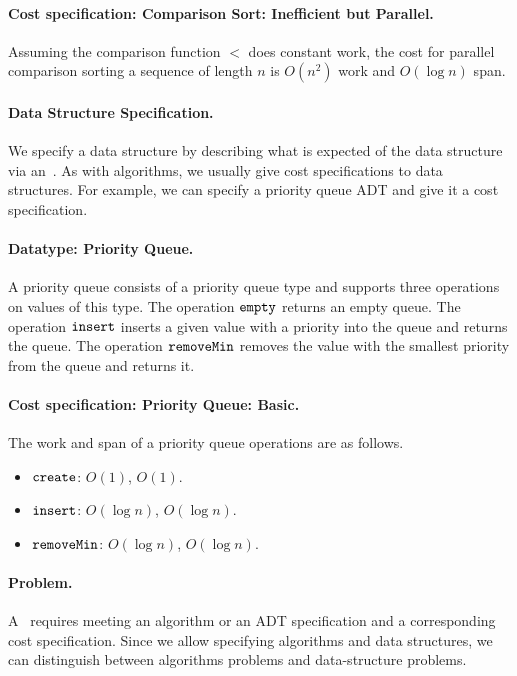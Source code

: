 \paragraph{Cost specification: Comparison Sort: Inefficient but Parallel.}
Assuming the comparison function $<$ does constant work, the cost for
parallel comparison sorting a sequence of length $n$ is $O(n^2)$ work
and $O(\log n)$ span.

\paragraph{Data Structure Specification.}
We specify a data structure by describing what is expected of the data
structure via an~.
%
As with algorithms, we usually give cost specifications to data
structures.
%
For example, we can specify a priority queue ADT and give it a cost
specification. 
%

\paragraph{Datatype: Priority Queue.}
A priority queue consists of a priority queue type and supports three
operations on values of this type.  The operation $\texttt{empty}$ returns
an empty queue.  The operation $\texttt{insert}$ inserts a given value with
a priority into the queue and returns the queue.  The operation
$\texttt{removeMin}$ removes the value with the smallest priority from the
queue and returns it.

\paragraph{Cost specification: Priority Queue: Basic.}
The work and span of a priority queue operations are as follows.
\begin{itemize}
\item $\texttt{create}$: $O(1)$, $O(1)$.
\item $\texttt{insert}$: $O(\log{n})$, $O(\log{n})$.
\item $\texttt{removeMin}$: $O(\log{n})$, $O(\log{n})$.
\end{itemize}

\paragraph{Problem.}
A~ requires meeting an algorithm or an ADT specification
and a corresponding cost specification.
%
Since we allow specifying algorithms and data structures, we can
distinguish between algorithms problems and data-structure problems.
%

